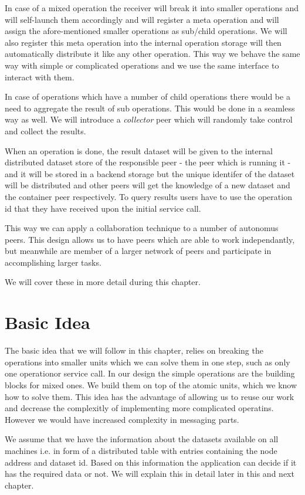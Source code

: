 In case of a mixed operation the receiver will break it into smaller operations and will self-launch them accordingly and
will register a meta operation and will assign the afore-mentioned smaller operations as sub/child operations. We will
also register this meta operation into the internal operation storage will then automatically distribute it like any other
operation. This way we behave the same way with simple or complicated operations and we use the same interface to interact
with them.

In case of operations which have a number of child operations there would be a need to aggregate the result of sub operations.
This would be done in a seamless way as well. We will introduce a \textit{collector} peer which will randomly take control
and collect the results.

When an operation is done, the result dataset will be given to the internal distributed dataset store of the responsible
peer - the peer which is running it - and it will be stored in a backend storage but the unique identifer of the dataset
will be distributed and other peers will get the knowledge of a new dataset and the container peer respectively. 
To query results users have to use the operation id that they have received upon the initial service call. 

This way we can apply a collaboration technique to a number of autonomus peers. 
This design allows us to have peers which are able to work independantly, 
but meanwhile are member of a larger network of peers and participate in accomplishing larger tasks.

We will cover these in more detail during this chapter.

\section{Basic Idea}
The basic idea that we will follow in this chapter, relies on breaking the operations into smaller units which
we can solve them in one step, such as only one operationor service call. 
In our design the simple operations are the building blocks for mixed ones.
We build them on top of the atomic units, which we know how to solve them.
This idea has the advantage of allowing us to reuse our work and decrease the complexitly of implementing
more complicated operatins. However we would have increased complexity in messaging parts.

We assume that we have the information about the datasets
available on all machines i.e. in form of a distributed table
with entries containing the node address and dataset id. Based on this
information the application can decide if it has the required data or
not. We will explain this in detail later in this and next chapter.

